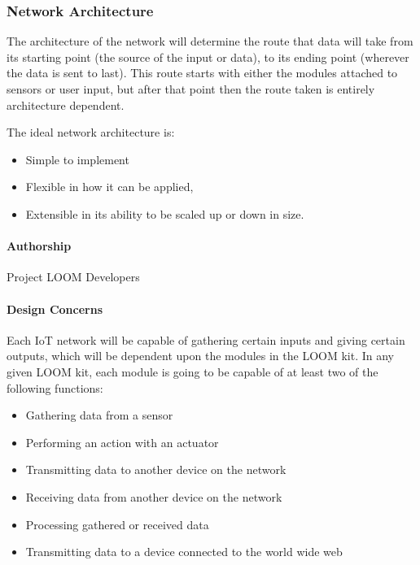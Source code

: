 \documentclass[onecolumn, draftclsnofoot,10pt, compsoc]{IEEEtran}
\begin{document}
\subsubsection{Network Architecture}
    The architecture of the network will determine the route that data will take from its starting point (the source of the input or data), to its ending point (wherever the data is sent to last). This route starts with either the modules attached to sensors or user input, but after that point then the route taken is entirely architecture dependent. 

    The ideal network architecture is:
    \begin{itemize}[noitemsep,topsep=-10pt]
        \item Simple to implement
        \item Flexible in how it can be applied,
        \item Extensible in its ability to be scaled up or down in size. 
    \end{itemize}

\paragraph{Authorship}
    Project LOOM Developers

\paragraph{Design Concerns}
    Each IoT network will be capable of gathering certain inputs and giving certain outputs, which will be dependent upon the modules in the LOOM kit. In any given LOOM kit, each module is going to be capable of at least two of the following functions:

    \begin{itemize}[noitemsep,topsep=-10pt]
        \item Gathering data from a sensor
        \item Performing an action with an actuator
        \item Transmitting data to another device on the network
        \item Receiving data from another device on the network
        \item Processing gathered or received data
        \item Transmitting data to a device connected to the world wide web\\
    \end{itemize}
    
\end{document}
